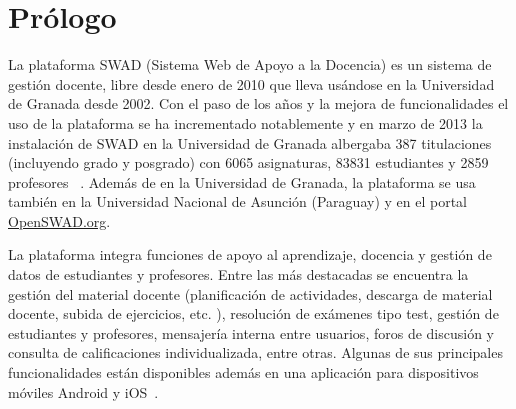 \chapter*{Prólogo}

La plataforma SWAD (Sistema Web de Apoyo a la Docencia) es un sistema de gestión docente, libre desde enero de 2010 que lleva usándose en la Universidad de Granada desde 2002. Con el paso de los años y la mejora de funcionalidades el uso de la plataforma se ha incrementado notablemente y en marzo de 2013 la instalación de SWAD en la Universidad de Granada albergaba 387 titulaciones (incluyendo grado y posgrado) con 6065 asignaturas, 83831 estudiantes y 2859 profesores ~\cite{swad:stat}. Además de en la Universidad de Granada, la plataforma se usa también en la Universidad Nacional de Asunción (Paraguay) y en el portal \url{OpenSWAD.org}.

La plataforma integra funciones de apoyo al aprendizaje, docencia y gestión de datos de estudiantes y profesores. Entre las más destacadas se encuentra la gestión del material docente (planificación de actividades, descarga de material docente, subida de ejercicios, etc. ), resolución de exámenes tipo test, gestión de estudiantes y profesores, mensajería interna entre usuarios, foros de discusión y consulta de calificaciones individualizada, entre otras. Algunas de sus principales funcionalidades están disponibles además en una aplicación para dispositivos móviles Android y iOS~\cite{swad:info}.

